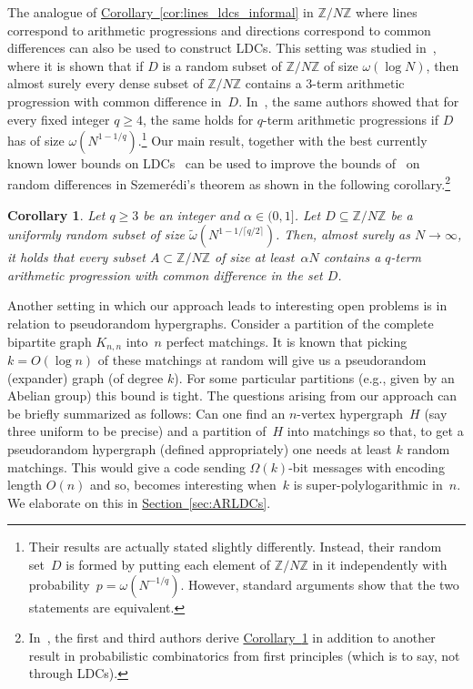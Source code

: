 \documentclass[11pt]{article}
\numberwithin{equation}{section}
\newtheorem{corollary}[theorem]{Corollary}
\theoremstyle{definition}
\theoremstyle{plain}
\newcommand{\Z}{\mathbb Z}
\newcommand{\expref}[2]{\hyperref[#2]{#1~\ref{#2}}}
\newcommand{\ceil}[1]{\lceil{#1}\rceil}
\begin{document}
The analogue of \expref{Corollary}{cor:lines_ldcs_informal} in $\Z/N\Z$ where lines correspond to arithmetic progressions and directions correspond to common differences can also be used to construct LDCs. 
%
This setting was studied in~\cite{FLW12}, where it is shown that 
 if $D$ is a random subset of $\Z/N\Z$ of size $\omega(\log N)$, then almost surely every dense subset of $\Z/N\Z$ contains a $3$-term arithmetic progression with common difference in~$D$.
In~\cite{FLW16}, the same authors showed that for every fixed integer $q \geq 4$, the same holds for $q$-term arithmetic progressions if $D$ has of size $\omega(N^{1-1/q})$.\footnote{Their results are actually stated slightly differently.
Instead, their random set~$D$ is formed by putting each element of $\Z/N\Z$ in it independently with probability~$p = \omega(N^{-1/q})$.
However, standard arguments show that the two statements are equivalent.
}
%
Our main result, together with the best currently known lower bounds on LDCs~\cite{Kerenidis:2004,Woodruff:2007a} can be used to improve the bounds of~\cite{FLW16} on random differences in Szemer\'edi's theorem as shown in the following corollary.\footnote{In~\cite{BG:2018}, the first and third authors derive \expref{Corollary}{cor:Szrandom} in addition to another result in probabilistic combinatorics from first principles (which is to say, not through LDCs).}

%
\begin{corollary}\label{cor:Szrandom}
Let  $q \geq 3$ be an integer and $\alpha \in (0,1]$.
Let $D\subseteq \Z/N\Z$ be a uniformly random subset of size $\tilde\omega(N^{1-1/\ceil{q/2}})$.
Then, almost surely as $N\longrightarrow \infty$, it holds that every subset $A\subset \Z/N\Z$ of size at least~$\alpha N$ contains a $q$-term arithmetic progression with common difference in the set $D$.
%
%
\end{corollary}
%

Another setting in which our approach leads to interesting open problems is in relation to pseudorandom hypergraphs. Consider a partition of the complete bipartite graph $K_{n,n}$ into~$n$ perfect matchings. It is known that picking $k = O(\log n)$ of these matchings at random will give us a pseudorandom (expander) graph (of degree $k$). For some particular partitions (e.g., given by an Abelian group) 
 this bound is tight. The questions arising from our approach can be briefly summarized as follows: Can one find an $n$-vertex hypergraph~$H$ (say three uniform to be precise) and a partition of~$H$ into matchings so that, to get a pseudorandom hypergraph (defined appropriately) one needs  at least $k$  random matchings. This would give a code sending $\Omega(k)$-bit messages with encoding length $O(n)$ and so, becomes interesting when~$k$ is super-polylogarithmic in~$n$. %
 We elaborate on this in \expref{Section}{sec:ARLDCs}.
\end{document}

